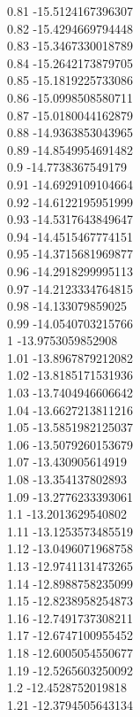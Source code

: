 {0.81	-15.5124167396307\\
0.82	-15.4294669794448\\
0.83	-15.3467330018789\\
0.84	-15.2642173879705\\
0.85	-15.1819225733086\\
0.86	-15.0998508580711\\
0.87	-15.0180044162879\\
0.88	-14.9363853043965\\
0.89	-14.8549954691482\\
0.9	-14.7738367549179\\
0.91	-14.6929109104664\\
0.92	-14.6122195951999\\
0.93	-14.5317643849647\\
0.94	-14.4515467774151\\
0.95	-14.3715681969877\\
0.96	-14.2918299995113\\
0.97	-14.2123334764815\\
0.98	-14.133079859025\\
0.99	-14.0540703215766\\
1	-13.9753059852908\\
1.01	-13.8967879212082\\
1.02	-13.8185171531936\\
1.03	-13.7404946606642\\
1.04	-13.6627213811216\\
1.05	-13.5851982125037\\
1.06	-13.5079260153679\\
1.07	-13.430905614919\\
1.08	-13.354137802893\\
1.09	-13.2776233393061\\
1.1	-13.2013629540802\\
1.11	-13.1253573485519\\
1.12	-13.0496071968758\\
1.13	-12.9741131473265\\
1.14	-12.8988758235099\\
1.15	-12.8238958254873\\
1.16	-12.7491737308211\\
1.17	-12.6747100955452\\
1.18	-12.6005054550677\\
1.19	-12.5265603250092\\
1.2	-12.4528752019818\\
1.21	-12.3794505643134\\
}
